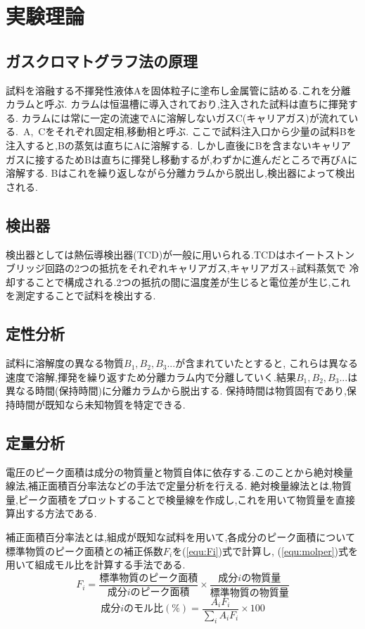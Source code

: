 \section{実験理論}
\subsection{ガスクロマトグラフ法の原理}
試料を溶融する不揮発性液体Aを固体粒子に塗布し金属管に詰める.これを分離カラムと呼ぶ.
カラムは恒温槽に導入されており,注入された試料は直ちに揮発する.
カラムには常に一定の流速でAに溶解しないガスC(キャリアガス)が流れている.\ A,\ Cをそれぞれ固定相,移動相と呼ぶ.
ここで試料注入口から少量の試料Bを注入すると,Bの蒸気は直ちにAに溶解する.
しかし直後にBを含まないキャリアガスに接するためBは直ちに揮発し移動するが,わずかに進んだところで再びAに溶解する.
Bはこれを繰り返しながら分離カラムから脱出し,検出器によって検出される.
\subsection{検出器}
検出器としては熱伝導検出器(TCD)が一般に用いられる.TCDはホイートストンブリッジ回路の2つの抵抗をそれぞれキャリアガス,キャリアガス+試料蒸気で
冷却することで構成される.2つの抵抗の間に温度差が生じると電位差が生じ,これを測定することで試料を検出する.
\subsection{定性分析}
試料に溶解度の異なる物質$B_1,B_2,B_3...$が含まれていたとすると,
これらは異なる速度で溶解,揮発を繰り返すため分離カラム内で分離していく.結果$B_1,B_2,B_3...$は異なる時間(保持時間)に分離カラムから脱出する.
保持時間は物質固有であり,保持時間が既知なら未知物質を特定できる.
\subsection{定量分析}
電圧のピーク面積は成分の物質量と物質自体に依存する.このことから絶対検量線法,補正面積百分率法などの手法で定量分析を行える.
絶対検量線法とは,物質量,ピーク面積をプロットすることで検量線を作成し,これを用いて物質量を直接算出する方法である.

補正面積百分率法とは,組成が既知な試料を用いて,各成分のピーク面積について標準物質のピーク面積との補正係数$F_i$を(\ref{equ:Fi})式で計算し\cite{rikougaku},
(\ref{equ:molper})式を用いて組成モル比を計算する手法である.
\begin{equation}
  \label{equ:Fi}
  F_i=\frac{標準物質のピーク面積}{成分iのピーク面積}\times\frac{成分iの物質量}{標準物質の物質量}
\end{equation}
\begin{equation}
  \label{equ:molper}
  成分iのモル比(\%)=\frac{A_i F_i}{\sum_i A_i F_i}\times100
\end{equation}